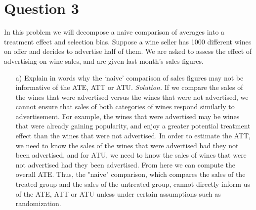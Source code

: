 \documentclass[
]{article}
\begin{document}
\hypertarget{question-3}{%
\section{Question 3}\label{question-3}}

In this problem we will decompose a naive comparison of averages into a
treatment effect and selection bias. Suppose a wine seller has 1000
different wines on offer and decides to advertise half of them. We are
asked to assess the effect of advertising on wine sales, and are given
last month's sales figures.

\begin{enumerate}
\item[a)] Explain in words why the ‘naive’ comparison of sales figures may not be informative of the ATE, ATT or ATU.
\newline
\newline
\textit{Solution.} If we compare the sales of the wines that were advertised versus the wines that were not advertised, we cannot ensure that sales of both categories of wines respond similarly to advertisement. For example, the wines that were advertised may be wines that were already gaining popularity, and enjoy a greater potential treatment effect than the wines that were not advertised. In order to estimate the ATT, we need to know the sales of the wines that were advertised had they not been advertised, and for ATU, we need to know the sales of wines that were not advertised had they been advertised. From here we can compute the overall ATE. Thus, the "naive" comparison, which compares the sales of the treated group and the sales of the untreated group, cannot directly inform us of the ATE, ATT or ATU unless under certain assumptions such as randomization.  


\end{enumerate}
\end{document}
